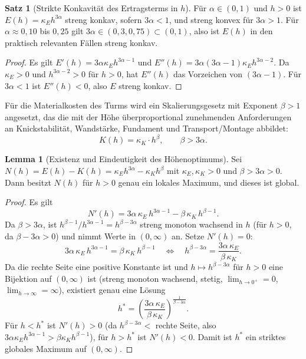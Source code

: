 ﻿\documentclass[a4paper,12pt]{article}
\theoremstyle{definition}
\newtheorem{satz}{Satz}
\newtheorem{lemma}{Lemma}
\begin{document}
\begin{satz}[Strikte Konkavität des Ertragsterms in $h$]
\label{satz:konkav_ertrag}
Für $\alpha \in (0,1)$ und $h>0$ ist $E(h) = \kappa_E h^{3\alpha}$ streng konkav, sofern $3\alpha < 1$, und streng konvex für $3\alpha>1$. Für $\alpha \approx 0{,}10$ bis $0{,}25$ gilt $3\alpha \in (0{,}3, 0{,}75) \subset (0,1)$, also ist $E(h)$ in den praktisch relevanten Fällen streng konkav.
\end{satz}

\begin{proof}
Es gilt $E'(h) = 3\alpha \kappa_E h^{3\alpha-1}$ und $E''(h) = 3\alpha(3\alpha-1)\kappa_E h^{3\alpha-2}$. Da $\kappa_E>0$ und $h^{3\alpha-2}>0$ für $h>0$, hat $E''(h)$ das Vorzeichen von $(3\alpha-1)$. Für $3\alpha<1$ ist $E''(h)<0$, also $E$ streng konkav. \qedhere
\end{proof}

Für die Materialkosten des Turms wird ein Skalierungsgesetz mit Exponent $\beta>1$ angesetzt, das die mit der Höhe überproportional zunehmenden Anforderungen an Knickstabilität, Wandstärke, Fundament und Transport/Montage abbildet:
\[
K(h) = \kappa_K \cdot h^{\beta}, \qquad \beta > 3\alpha.
\]

\begin{lemma}[Existenz und Eindeutigkeit des Höhenoptimums]
\label{lem:hoehe_existenz}
Sei $N(h) = E(h) - K(h) = \kappa_E h^{3\alpha} - \kappa_K h^{\beta}$ mit $\kappa_E,\kappa_K>0$ und $\beta > 3\alpha > 0$. Dann besitzt $N(h)$ für $h>0$ genau ein lokales Maximum, und dieses ist global.
\end{lemma}

\begin{proof}
Es gilt
\[
N'(h) = 3\alpha\,\kappa_E\, h^{3\alpha-1} - \beta\,\kappa_K\, h^{\beta-1}.
\]
Da $\beta>3\alpha$, ist $h^{\beta-1}/h^{3\alpha-1} = h^{\beta-3\alpha}$ streng monoton wachsend in $h$ (für $h>0$, da $\beta-3\alpha>0$) und nimmt Werte in $(0,\infty)$ an. Setze $N'(h)=0$:
\[
3\alpha\,\kappa_E\, h^{3\alpha-1} = \beta\,\kappa_K\, h^{\beta-1}
\quad\Longleftrightarrow\quad
h^{\beta-3\alpha} = \frac{3\alpha\,\kappa_E}{\beta\,\kappa_K}.
\]
Da die rechte Seite eine positive Konstante ist und $h \mapsto h^{\beta-3\alpha}$ für $h>0$ eine Bijektion auf $(0,\infty)$ ist (streng monoton wachsend, stetig, $\lim_{h\to0^+}=0$, $\lim_{h\to\infty}=\infty$), existiert genau eine Lösung
\[
h^* = \left(\frac{3\alpha\,\kappa_E}{\beta\,\kappa_K}\right)^{\frac{1}{\beta-3\alpha}}.
\]
Für $h<h^*$ ist $N'(h)>0$ (da $h^{\beta-3\alpha} < $ rechte Seite, also $3\alpha\kappa_E h^{3\alpha-1} > \beta\kappa_K h^{\beta-1}$), für $h>h^*$ ist $N'(h)<0$. Damit ist $h^*$ ein striktes globales Maximum auf $(0,\infty)$. \qedhere
\end{proof}
\end{document}
